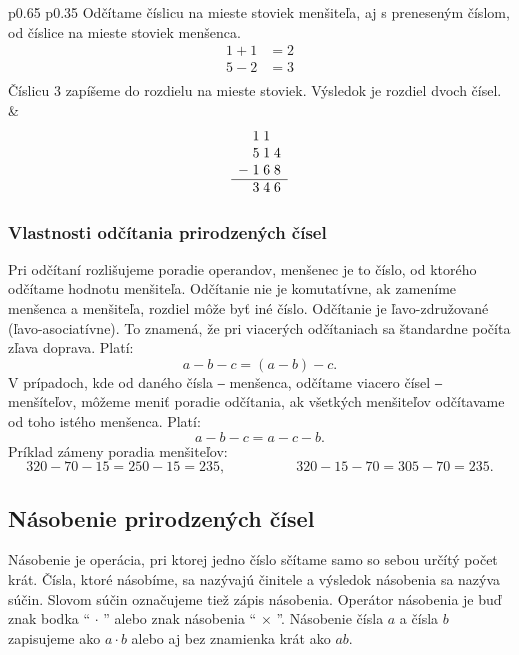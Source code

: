 \documentclass{report}
\begin{document}
\begin{longtable}{p{} p{}}
Odčítame číslicu na mieste stoviek menšiteľa, aj s preneseným číslom, od číslice na mieste stoviek menšenca.
\[
\begin{aligned}
  1 + 1 &= 2 \\
  5 - 2 &= 3 \\
\end{aligned}
\]
Číslicu \(3\) zapíšeme do rozdielu na mieste stoviek. Výsledok je rozdiel dvoch čísel.
&
\[
\begin{array}{c@{\;}c@{\;}c@{\;}c}
    & 1 & 1 &   \\
    & 5 & 1 & 4 \\
  - & 1 & 6 & 8 \\
  \hline
    & 3 & 4 & 6 \\
\end{array}
\]

\end{longtable}

\subsubsection{Vlastnosti odčítania prirodzených čísel}

Pri odčítaní rozlišujeme poradie operandov, menšenec je to číslo, od ktorého odčítame hodnotu menšiteľa. Odčítanie nie je komutatívne, ak zameníme menšenca a menšiteľa, rozdiel môže byť iné číslo. Odčítanie je ľavo-združované (ľavo-asociatívne). To znamená, že pri viacerých odčítaniach sa štandardne počíta zľava doprava. Platí:
\[
a - b - c = (a - b) - c.
\]
V prípadoch, kde od daného čísla ‒ menšenca, odčítame viacero čísel ‒ menšíteľov, môžeme meniť poradie odčítania, ak všetkých menšiteľov odčítavame od toho istého menšenca. Platí:
\[
a - b - c = a - c - b.
\]
Príklad zámeny poradia menšiteľov:
\[
320 - 70 - 15 = 250 - 15 = 235, \hspace{5em} 320 - 15 - 70 = 305 - 70 = 235.
\]

\subsection{Násobenie prirodzených čísel}

Násobenie je operácia, pri ktorej jedno číslo sčítame samo so sebou určítý počet krát. Čísla, ktoré násobíme, sa nazývajú činitele a výsledok násobenia sa nazýva súčin. Slovom súčin označujeme tiež zápis násobenia. Operátor násobenia je buď znak bodka \enquote{\(\, \cdot\, \)} alebo znak násobenia \enquote{\(\, \times \,\)}. Násobenie čísla \(a\) a čísla \(b\) zapisujeme ako \(a \cdot b\) alebo aj bez znamienka krát ako \(ab\).
\end{document}
